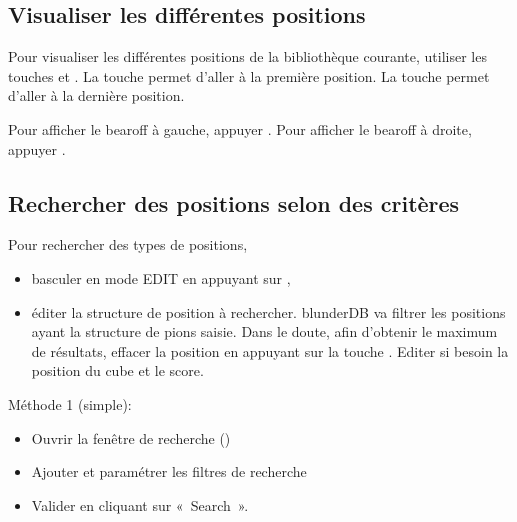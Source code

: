 \documentclass[letterpaper,10pt,french]{sphinxmanual}
\begin{document}
\subsection{Visualiser les différentes positions}
\label{\detokenize{guide_utilisateur:visualiser-les-differentes-positions}}
\sphinxAtStartPar
Pour visualiser les différentes positions de la bibliothèque courante, utiliser
les touches  et . La touche  permet d’aller à la première
position. La touche  permet d’aller à la dernière position.

\sphinxAtStartPar
Pour afficher le bearoff à gauche, appuyer . Pour afficher le
bearoff à droite, appuyer .


\subsection{Rechercher des positions selon des critères}
\label{\detokenize{guide_utilisateur:rechercher-des-positions-selon-des-criteres}}
\sphinxAtStartPar
Pour rechercher des types de positions,
\begin{itemize}
\item {} 
\sphinxAtStartPar
basculer en mode EDIT en appuyant sur ,

\item {} 
\sphinxAtStartPar
éditer la structure de position à rechercher. blunderDB va filtrer les
positions ayant  la structure de pions saisie. Dans le
doute, afin d’obtenir le maximum de résultats, effacer la position
en appuyant sur la touche . Editer si besoin la
position du cube et le score.

\end{itemize}

\sphinxAtStartPar
Méthode 1 (simple):
\begin{itemize}
\item {} 
\sphinxAtStartPar
Ouvrir la fenêtre de recherche ()

\item {} 
\sphinxAtStartPar
Ajouter et paramétrer les filtres de recherche

\item {} 
\sphinxAtStartPar
Valider en cliquant sur « Search ».

\end{itemize}
\end{document}
